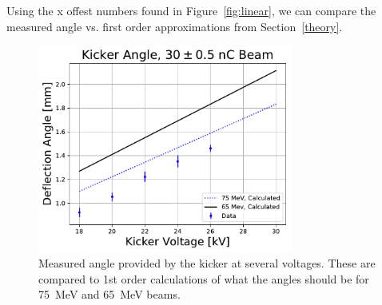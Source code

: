 Using the x offest numbers found in Figure~\ref{fig:linear}, 
we can compare the measured angle vs. first order approximations from Section~\ref{theory}.
\begin{figure}
	\centering
	\includegraphics[width=0.75\textwidth]{./images/kicker_angle_comparison}
	\caption{Measured angle provided by the kicker at several voltages.
	These are compared to 1st order calculations of what the angles should be for 
	\SI{75}{MeV} and \SI{65}{MeV} beams.}
	\label{fig:angles}
\end{figure}



